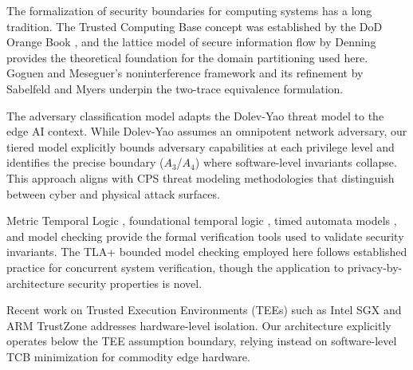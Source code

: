 \documentclass[conference]{IEEEtran}
\begin{document}
The formalization of security boundaries for computing systems has a long tradition. The Trusted Computing Base concept was established by the DoD Orange Book \cite{b3}, and the lattice model of secure information flow by Denning \cite{b12} provides the theoretical foundation for the domain partitioning used here. Goguen and Meseguer's noninterference framework \cite{b8} and its refinement by Sabelfeld and Myers \cite{b11} underpin the two-trace equivalence formulation.

The adversary classification model adapts the Dolev-Yao threat model \cite{b2} to the edge AI context. While Dolev-Yao assumes an omnipotent network adversary, our tiered model explicitly bounds adversary capabilities at each privilege level and identifies the precise boundary ($A_3$/$A_4$) where software-level invariants collapse. This approach aligns with CPS threat modeling methodologies \cite{b30_cps} that distinguish between cyber and physical attack surfaces.

Metric Temporal Logic \cite{b9}, foundational temporal logic \cite{b13}, timed automata models \cite{b20}, and model checking \cite{b10} provide the formal verification tools used to validate security invariants. The TLA+ bounded model checking employed here follows established practice for concurrent system verification, though the application to privacy-by-architecture security properties is novel.

Recent work on Trusted Execution Environments (TEEs) such as Intel SGX \cite{b16} and ARM TrustZone \cite{b17_tz} addresses hardware-level isolation. Our architecture explicitly operates below the TEE assumption boundary, relying instead on software-level TCB minimization for commodity edge hardware.
\end{document}
